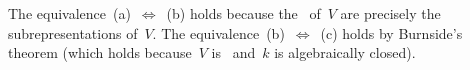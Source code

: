 \section{}

The equivalence~(a)~$\iff$~(b) holds because the~ of~$V$ are precisely the subrepresentations of~$V$.
The equivalence~(b)~$\iff$~(c) holds by Burnside’s theorem (which holds because~$V$ is~ and~$k$ is algebraically closed).




